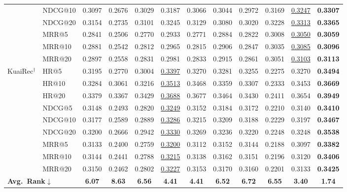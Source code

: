 \documentclass[sigconf,review,anonymous]{acmart}
\newcommand{\tblbest}[1]{\textbf{#1}}
\newcommand{\tblsecond}[1]{\underline{#1}}
\begin{document}
\begin{table}[!t]
{\begin{tabular}{ll*{9}{c}>{\columncolor{routerecgray}}c}
      & NDCG@10 & 0.3097 & 0.2676 & 0.3029 & 0.3187 & 0.3066 & 0.3044 & 0.2972 & 0.3169 & \tblsecond{0.3247} & \tblbest{0.3307} \\
      & NDCG@20 & 0.3154 & 0.2735 & 0.3101 & 0.3245 & 0.3129 & 0.3080 & 0.3020 & 0.3228 & \tblsecond{0.3313} & \tblbest{0.3365} \\
      & MRR@5   & 0.2841 & 0.2506 & 0.2770 & 0.2933 & 0.2771 & 0.2884 & 0.2822 & 0.3008 & \tblsecond{0.3050} & \tblbest{0.3059} \\
      & MRR@10  & 0.2881 & 0.2542 & 0.2812 & 0.2965 & 0.2815 & 0.2906 & 0.2847 & 0.3035 & \tblsecond{0.3085} & \tblbest{0.3096} \\
      & MRR@20  & 0.2897 & 0.2558 & 0.2831 & 0.2981 & 0.2833 & 0.2915 & 0.2861 & 0.3051 & \tblsecond{0.3103} & \tblbest{0.3113} \\
    \midrule
    \multirow{9}{*}{KuaiRec$^\dagger$}
      & HR@5    & 0.3195 & 0.2770 & 0.3004 & \tblsecond{0.3397} & 0.3270 & 0.3281 & 0.3255 & 0.2275 & 0.3270 & \tblbest{0.3494} \\
      & HR@10   & 0.3284 & 0.3061 & 0.3216 & \tblsecond{0.3513} & 0.3468 & 0.3359 & 0.3307 & 0.2333 & 0.3453 & \tblbest{0.3669} \\
      & HR@20   & 0.3379 & 0.3367 & 0.3429 & \tblsecond{0.3688} & 0.3677 & 0.3464 & 0.3430 & 0.2411 & 0.3654 & \tblbest{0.3949} \\
      & NDCG@5  & 0.3148 & 0.2493 & 0.2820 & \tblsecond{0.3249} & 0.3152 & 0.3184 & 0.3172 & 0.2210 & 0.3140 & \tblbest{0.3410} \\
      & NDCG@10 & 0.3177 & 0.2589 & 0.2889 & \tblsecond{0.3286} & 0.3215 & 0.3209 & 0.3188 & 0.2229 & 0.3197 & \tblbest{0.3467} \\
      & NDCG@20 & 0.3200 & 0.2666 & 0.2942 & \tblsecond{0.3330} & 0.3269 & 0.3236 & 0.3220 & 0.2248 & 0.3248 & \tblbest{0.3538} \\
      & MRR@5   & 0.3133 & 0.2400 & 0.2759 & \tblsecond{0.3200} & 0.3112 & 0.3152 & 0.3144 & 0.2188 & 0.3097 & \tblbest{0.3382} \\
      & MRR@10  & 0.3144 & 0.2441 & 0.2788 & \tblsecond{0.3215} & 0.3138 & 0.3162 & 0.3151 & 0.2196 & 0.3120 & \tblbest{0.3406} \\
      & MRR@20  & 0.3150 & 0.2462 & 0.2802 & \tblsecond{0.3227} & 0.3153 & 0.3170 & 0.3160 & 0.2201 & 0.3133 & \tblbest{0.3425} \\
    \midrule
    \multicolumn{2}{l}{\textbf{Avg.~Rank$\downarrow$}} & \textbf{6.07} & \textbf{8.63} & \textbf{6.56} & \textbf{4.41} & \textbf{4.41} & \textbf{6.52} & \textbf{6.72} & \textbf{6.55} & \textbf{3.40} & \textbf{1.74} \\
    \bottomrule
  \end{tabular}}
\end{table}
\end{document}
